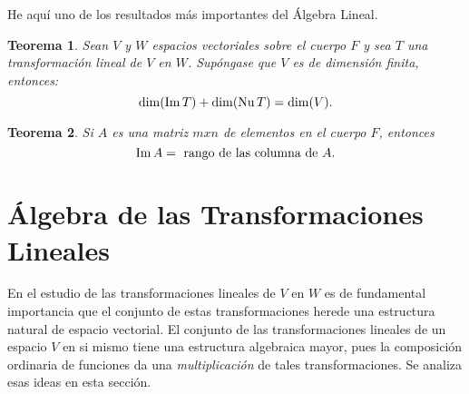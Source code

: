\documentclass[b5paper, 11pt]{book}
\newcommand{\0}{\mathbf{0}}
\theoremstyle{estiloB}
\theoremstyle{estiloC}
\newtheorem{unteo}{Teorema}[chapter]
\theoremstyle{estiloD}
\theoremstyle{estiloE}
\newcommand{\nnu}{\mathop{\rm Nu}\nolimits}
\newcommand{\iim}{\mathop{\rm Im}\nolimits}
\begin{document}
He aquí uno de los resultados m\'as importantes del Álgebra Lineal.

\begin{unteo}
 Sean $V$ y $W$ espacios vectoriales sobre el cuerpo $F$ y sea $T$ una transformaci\'on lineal de $V$ en $W$. Supóngase que $V$ es de dimensi\'on finita, entonces:
\[
\dim (\iim T) + \dim (\nnu T)= \dim (V).
\]
\end{unteo}
\begin{unteo}
Si $A$ es una matriz $mxn$ de elementos en el cuerpo $F$, entonces
\[
\iim A= \text{ rango de las columna de } A.
\]
\end{unteo}

\section{\'Algebra de las Transformaciones Lineales}
En el estudio de las transformaciones lineales de $V$ en $W$ es de fundamental importancia que el conjunto de estas transformaciones herede una estructura natural de espacio vectorial. El conjunto de las transformaciones lineales de un espacio $V$ en si mismo tiene una estructura algebraica mayor, pues la composici\'on ordinaria de funciones da una \textit{multiplicaci\'on} de tales transformaciones. Se analiza esas ideas en esta secci\'on.
\end{document}

